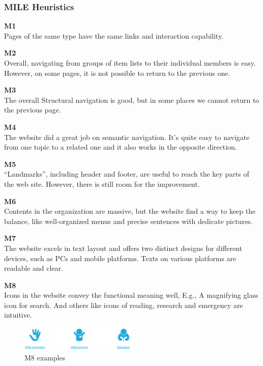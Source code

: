 \subsubsection{MILE Heuristics}
\begin{description}
\item {\textbf{M1} \color{unicefGray}{Interaction consistency}}\\
Pages of the same type have the same links and interaction capability.

\item {\textbf{M2} \color{unicefGray}{Group navigation}}\\
Overall, navigating from groups of item lists to their individual members is easy. However, on some pages, it is not possible to return to the previous one.

\item {\textbf{M3} \color{unicefGray}{Navigation support}}\\
The overall Structural navigation is good, but in some places we cannot return to the previous page.

\item {\textbf{M4} \color{unicefGray}{User control}}\\
The website did a great job on semantic navigation. It's quite easy to navigate from one topic to a related one and it also works in the opposite direction.

\item {\textbf{M5} \color{unicefGray}{Error prevention}}\\
“Landmarks”, including header and footer, are useful to reach the key parts of the web site. However, there is still room for the improvement.

\item {\textbf{M6} \color{unicefGray}{Information overload}}\\
 Contents in the organization are massive, but the website find a way to keep the balance, like well-organized menus and precise sentences with dedicate pictures.

\item {\textbf{M7} \color{unicefGray}{Text layout}}\\
The website excels in text layout and offers two distinct designs for different devices, such as PCs and mobile platforms. Texts on various platforms are readable and clear.

\item {\textbf{M8} \color{unicefGray}{Interaction placeholder semiotics}}\\
Icons in the website convey the functional meaning well, E.g.,  A magnifying glass icon for search. And others like icons of reading, research and emergency are intuitive.
\begin{figure}[H]
	\centering
	\includegraphics[width=0.5\textwidth]{Resources/Yan/yan_m8.png}
	\caption{M8 examples}
	\label{fig:m8}
\end{figure}


\end{description}
